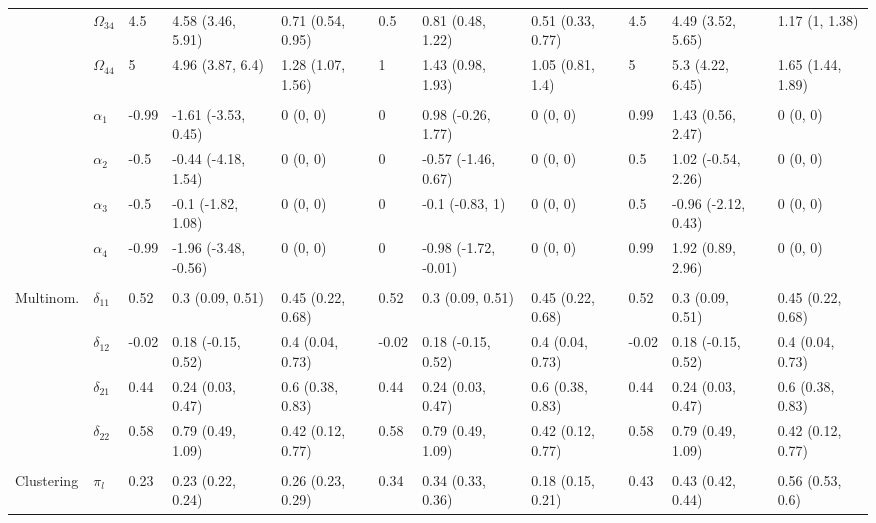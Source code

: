 \documentclass[]{article}
\begin{document}
\begin{landscape}
\begin{table}[t]
\begin{tabular}{lllllllllll}
\hspace{1em} & $\Omega_{34}$ & 4.5 & 4.58 (3.46, 5.91) & 0.71 (0.54, 0.95) & 0.5 & 0.81 (0.48, 1.22) & 0.51 (0.33, 0.77) & 4.5 & 4.49 (3.52, 5.65) & 1.17 (1, 1.38)\\
\hspace{1em} & $\Omega_{44}$ & 5 & 4.96 (3.87, 6.4) & 1.28 (1.07, 1.56) & 1 & 1.43 (0.98, 1.93) & 1.05 (0.81, 1.4) & 5 & 5.3 (4.22, 6.45) & 1.65 (1.44, 1.89)\\
\addlinespace[0.3em]
\multicolumn{11}{l}{\textbf{ }}\\
\hspace{1em} & $\alpha_{1}$ & -0.99 & -1.61 (-3.53, 0.45) & 0 (0, 0) & 0 & 0.98 (-0.26, 1.77) & 0 (0, 0) & 0.99 & 1.43 (0.56, 2.47) & 0 (0, 0)\\
\hspace{1em} & $\alpha_{2}$ & -0.5 & -0.44 (-4.18, 1.54) & 0 (0, 0) & 0 & -0.57 (-1.46, 0.67) & 0 (0, 0) & 0.5 & 1.02 (-0.54, 2.26) & 0 (0, 0)\\
\hspace{1em} & $\alpha_{3}$ & -0.5 & -0.1 (-1.82, 1.08) & 0 (0, 0) & 0 & -0.1 (-0.83, 1) & 0 (0, 0) & 0.5 & -0.96 (-2.12, 0.43) & 0 (0, 0)\\
\hspace{1em} & $\alpha_{4}$ & -0.99 & -1.96 (-3.48, -0.56) & 0 (0, 0) & 0 & -0.98 (-1.72, -0.01) & 0 (0, 0) & 0.99 & 1.92 (0.89, 2.96) & 0 (0, 0)\\
\addlinespace[0.3em]
\multicolumn{11}{l}{\textbf{ }}\\
\hspace{1em}Multinom. & $\delta_{11}$ & 0.52 & 0.3 (0.09, 0.51) & 0.45 (0.22, 0.68) & 0.52 & 0.3 (0.09, 0.51) & 0.45 (0.22, 0.68) & 0.52 & 0.3 (0.09, 0.51) & 0.45 (0.22, 0.68)\\
\hspace{1em} & $\delta_{12}$ & -0.02 & 0.18 (-0.15, 0.52) & 0.4 (0.04, 0.73) & -0.02 & 0.18 (-0.15, 0.52) & 0.4 (0.04, 0.73) & -0.02 & 0.18 (-0.15, 0.52) & 0.4 (0.04, 0.73)\\
\hspace{1em} & $\delta_{21}$ & 0.44 & 0.24 (0.03, 0.47) & 0.6 (0.38, 0.83) & 0.44 & 0.24 (0.03, 0.47) & 0.6 (0.38, 0.83) & 0.44 & 0.24 (0.03, 0.47) & 0.6 (0.38, 0.83)\\
\hspace{1em} & $\delta_{22}$ & 0.58 & 0.79 (0.49, 1.09) & 0.42 (0.12, 0.77) & 0.58 & 0.79 (0.49, 1.09) & 0.42 (0.12, 0.77) & 0.58 & 0.79 (0.49, 1.09) & 0.42 (0.12, 0.77)\\
\addlinespace[0.3em]
\multicolumn{11}{l}{\textbf{ }}\\
\hspace{1em}Clustering & $\pi_l$ & 0.23 & 0.23 (0.22, 0.24) & 0.26 (0.23, 0.29) & 0.34 & 0.34 (0.33, 0.36) & 0.18 (0.15, 0.21) & 0.43 & 0.43 (0.42, 0.44) & 0.56 (0.53, 0.6)\\
\bottomrule
\end{tabular}
\end{table}
\end{landscape}
\end{document}
